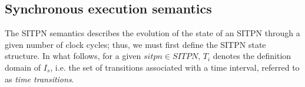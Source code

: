 \documentclass[pdflatex,sn-mathphys]{sn-jnl}%
\theoremstyle{thmstyleone}%
\theoremstyle{thmstyletwo}%
\theoremstyle{thmstylethree}%
\begin{document}



\subsection{Synchronous execution semantics}
\label{subsec:hpn-particularities}

 The SITPN semantics describes
the evolution of the state of an SITPN through a given number of clock
cycles; thus, we must first define the SITPN state structure. In what
follows, for a given $sitpn\in{}SITPN$, $T_i$ denotes the definition
domain of $I_s$, i.e. the set of transitions associated with a time
interval, referred to as \textit{time transitions}.
\end{document}
